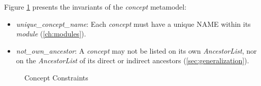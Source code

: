 \begin{constraints}
Figure \ref{fig:ocl:concept} presents the invariants of the \emph{concept} metamodel:

\begin{itemize}

\item \emph{unique\_concept\_name}:
Each \emph{concept} must have a unique NAME within its \emph{module} (\ref{ch:modules}).

\item \emph{not\_own\_ancestor}:
A \emph{concept} may not be listed on its own \emph{AncestorList},
nor on the \emph{AncestorList} of its direct or indirect ancestors (\ref{sec:generalization}).

\end{itemize}
\end{constraints}

\begin{figure}

\caption{Concept Constraints}
\label{fig:ocl:concept}
\end{figure}
